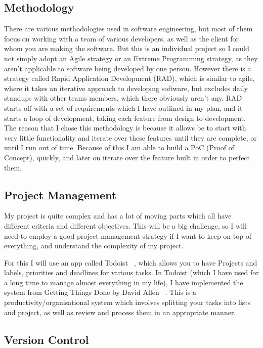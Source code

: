 \documentclass[titlepage]{article}
\begin{document}
\subsection{Methodology}
There are various methodologies used in software engineering, but most of them focus on working with a team of various developers, as well as the client for whom you are making the software. But this is an individual project so I could not simply adopt an Agile strategy or an Extreme Programming strategy, as they aren't applicable to software being developed by one person. However there is a strategy called Rapid Application Development (RAD), which is similar to agile, where it takes an iterative approach to developing software, but excludes daily standups with other teams members, which there obviously aren't any. RAD starts off with a set of requirements which I have outlined in my plan, and it starts a loop of development, taking each feature from design to development. The reason that I chose this methodology is because it allows be to start with very little functionality and iterate over these features until they are complete, or until I run out of time. Because of this I am able to build a PoC (Proof of Concept), quickly, and later on iterate over the feature built in order to perfect them.

\subsection{Project Management}
My project is quite complex and has a lot of moving parts which all have different criteria and different objectives. This will be a big challenge, so I will need to employ a good project management strategy if I want to keep on top of everything, and understand the complexity of my project.

For this I will use an app called Todoist ~\cite{todoist}, which allows you to have Projects and labels, priorities and deadlines for various tasks. In Todoist (which I have used for a long time to manage almost everything in my life), I have implemented the system from Getting Things Done by David Allen ~\cite{gtd}. This is a productivity/organisational system which involves splitting your tasks into lists and project, as well as review and process them in an appropriate manner.

\subsection{Version Control}
\end{document}
